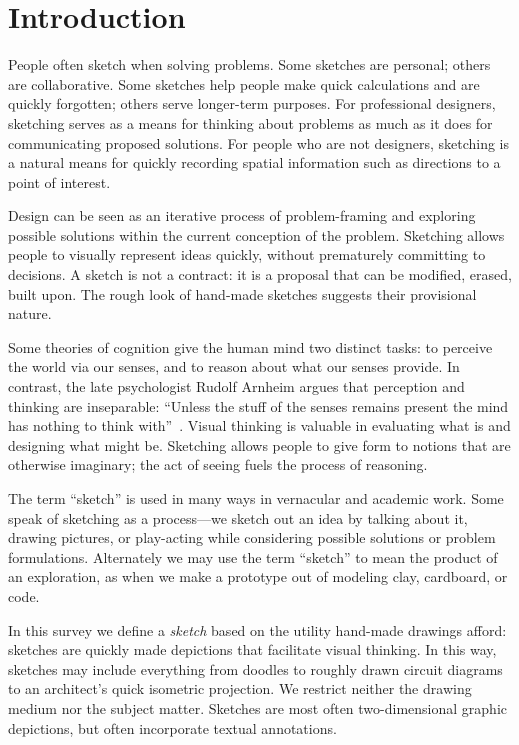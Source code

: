 \chapter{Introduction}
\label{sec:introduction}

People often sketch when solving problems.  Some sketches are
personal; others are collaborative. Some sketches help people make
quick calculations and are quickly forgotten; others serve longer-term
purposes. For professional designers, sketching serves as a means for
thinking about problems as much as it does for communicating proposed
solutions. For people who are not designers, sketching is a natural
means for quickly recording spatial information such as directions to
a point of interest.

Design can be seen as an iterative process of problem-framing and
exploring possible solutions within the current conception of the
problem. Sketching allows people to visually represent ideas quickly,
without prematurely committing to decisions. A sketch is not a
contract: it is a proposal that can be modified, erased, built
upon. The rough look of hand-made sketches suggests their provisional
nature.

Some theories of cognition give the human mind two distinct tasks: to
perceive the world via our senses, and to reason about what our senses
provide. In contrast, the late psychologist Rudolf Arnheim argues that
perception and thinking are inseparable: ``Unless the stuff of the
senses remains present the mind has nothing to think
with''~\cite{arnheim-visthink}. Visual thinking is valuable in
evaluating what is and designing what might be. Sketching allows
people to give form to notions that are otherwise imaginary; the act
of seeing fuels the process of reasoning.

The term ``sketch'' is used in many ways in vernacular and academic
work. Some speak of sketching as a process---we sketch out an idea by
talking about it, drawing pictures, or play-acting while considering
possible solutions or problem formulations. Alternately we may use the
term ``sketch'' to mean the product of an exploration, as when we make
a prototype out of modeling clay, cardboard, or code.

In this survey we define a \textit{sketch} based on the utility
hand-made drawings afford: sketches are quickly made depictions that
facilitate visual thinking. In this way, sketches may include
everything from doodles to roughly drawn circuit diagrams to an
architect's quick isometric projection. We restrict neither the
drawing medium nor the subject matter. Sketches are most often
two-dimensional graphic depictions, but often incorporate textual
annotations.

